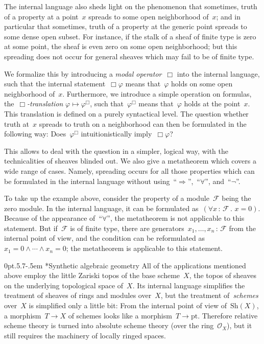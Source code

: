 \documentclass[10pt,reqno,a4paper]{amsbook}
\makeatletter
\theoremstyle{definition}
\theoremstyle{plain}
\theoremstyle{remark}
\newcommand{\F}{\mathcal{F}}
\renewcommand{\O}{\mathcal{O}}
\newcommand{\Sh}{\mathrm{Sh}}
\newcommand{\pt}{\mathrm{pt}}
\newcommand{\?}{\,{:}\,}
\renewcommand{\_}{\mathpunct{.}\,}
\def\subsection{\@startsection{subsection}{2}%
  {0pt}{.5\linespacing\@plus.7\linespacing}{-.5em}%
  {\normalfont\bfseries}}
\makeatother
\begin{document}
{The internal language also sheds light on the phenomenon that
sometimes, truth of a property at a point~$x$ spreads to some open
neighborhood of~$x$; and in particular that sometimes, truth of a property at
the generic point spreads to some dense open subset. For instance, if the stalk
of a sheaf of finite type is zero at some point, the sheaf is even zero on some
open neighborhood; but this spreading does not occur for general sheaves which
may fail to be of finite type.

We formalize this by introducing a \emph{modal operator}~$\Box$ into the
internal language, such that the internal statement~$\Box\varphi$ means
that~$\varphi$ holds on some open neighborhood of~$x$. Furthermore, we
introduce a simple operation on formulas, the~\emph{$\Box$-translation}
$\varphi \mapsto \varphi^\Box$, such that~$\varphi^\Box$ means that~$\varphi$
holds at the point~$x$. This translation is defined on a purely syntactical
level. The question whether truth at~$x$ spreads to truth on a
neighborhood can then be formulated in the following way: Does~$\varphi^\Box$
intuitionistically imply~$\Box\varphi$?

This allows to deal with the question in a simpler, logical way, with the
technicalities of sheaves blinded out. We also give a metatheorem which
covers a wide range of cases. Namely, spreading occurs for all those properties
which can be formulated in the internal language without
using~``$\Rightarrow$'',~``$\forall$'', and~``$\neg$''.

To take up the example above, consider the property of a module~$\F$ being
the zero module. In the internal language, it can be formulated as~$(\forall x\?\F\_ x = 0)$.
Because of the appearance of~``$\forall$'', the metatheorem is not
applicable to this statement. But if~$\F$ is of finite type, there are
generators~$x_1,\ldots,x_n\?\F$ from the internal point of view, and the
condition can be reformulated as~$x_1 = 0 \wedge \cdots \wedge x_n = 0$; the
metatheorem is applicable to this statement.


\subsection*{Synthetic algebraic geometry}
All of the applications mentioned above employ the little Zariski topos of the base
scheme~$X$, the topos of sheaves on the underlying topological space of~$X$.
Its internal language simplifies the treatment of sheaves of rings and modules
over~$X$, but the treatment of~\emph{schemes} over~$X$ is simplified only a
little bit: From the internal point of view of~$\Sh(X)$, a morphism~$T \to X$
of schemes looks like a morphism~$T \to \pt$. Therefore relative scheme theory
is turned into absolute scheme theory (over the ring~$\O_X$), but it still
requires the machinery of locally ringed spaces.

}
\end{document}
